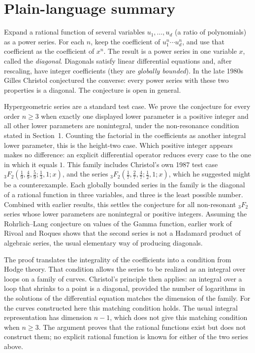 \documentclass[11pt]{amsart}
\theoremstyle{definition}
\theoremstyle{remark}
\numberwithin{equation}{section}
\begin{document}
\maketitle

\section*{Plain-language summary}

Expand a rational function of several variables $u_1,\dots,u_d$ (a ratio of polynomials) as a power series. For each $n$, keep the coefficient of $u_1^n\cdots u_d^n$, and use that coefficient as the coefficient of $x^n$. The result is a power series in one variable $x$, called the \emph{diagonal}. Diagonals satisfy linear differential equations and, after rescaling, have integer coefficients (they are \emph{globally bounded}). In the late 1980s Gilles Christol conjectured the converse: every power series with these two properties is a diagonal. The conjecture is open in general.

Hypergeometric series are a standard test case. We prove the conjecture for every order $n\ge3$ when exactly one displayed lower parameter is a positive integer and all other lower parameters are nonintegral, under the non-resonance condition stated in Section~1. Counting the factorial in the coefficients as another integral lower parameter, this is the height-two case. Which positive integer appears makes no difference: an explicit differential operator reduces every case to the one in which it equals $1$. This family includes Christol's own 1987 test case ${}_3F_2(\frac19,\frac49,\frac59;\frac13,1;x)$, and the series ${}_3F_2(\frac17,\frac27,\frac47;\frac12,1;x)$, which he suggested might be a counterexample. Each globally bounded series in the family is the diagonal of a rational function in three variables, and three is the least possible number. Combined with earlier results, this settles the conjecture for all non-resonant ${}_3F_2$ series whose lower parameters are nonintegral or positive integers. Assuming the Rohrlich--Lang conjecture on values of the Gamma function, earlier work of Rivoal and Roques shows that the second series is not a Hadamard product of algebraic series, the usual elementary way of producing diagonals.

The proof translates the integrality of the coefficients into a condition from Hodge theory. That condition allows the series to be realized as an integral over loops on a family of curves. Christol's principle then applies: an integral over a loop that shrinks to a point is a diagonal, provided the number of logarithms in the solutions of the differential equation matches the dimension of the family. For the curves constructed here this matching condition holds. The usual integral representation has dimension $n-1$, which does not give this matching condition when $n\ge3$. The argument proves that the rational functions exist but does not construct them; no explicit rational function is known for either of the two series above.
\end{document}
